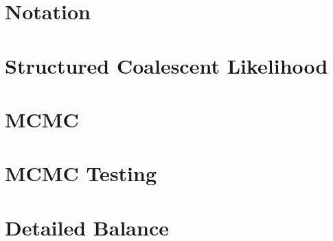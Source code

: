 \documentclass[12pt,a4paper]{article}
\begin{document}
	\section{Notation}
		
	
	\section{Structured Coalescent Likelihood}
		
	
	\section{MCMC}
		
				
	\section{MCMC Testing}
		
		
	\section{Detailed Balance}
					
\end{document}
